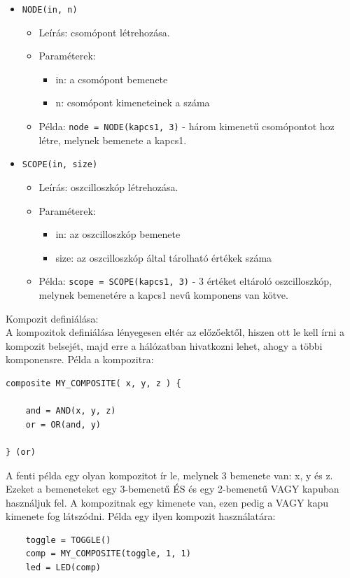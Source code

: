 \begin{itemize}
\item \texttt{NODE(in, n)}
	\begin{itemize}
	\item Leírás: csomópont létrehozása.
	\item Paraméterek: 
		\begin{itemize}
			\item in: a csomópont bemenete
			\item n: csomópont kimeneteinek a száma
		\end{itemize}
	\item Példa: \texttt{node = NODE(kapcs1, 3)} - három kimenetű csomópontot hoz létre, melynek bemenete a kapcs1.
	\end{itemize}
	
\item \texttt{SCOPE(in, size)}
\begin{itemize}
	\item Leírás: oszcilloszkóp létrehozása.
	\item Paraméterek: 
		\begin{itemize}
			\item in: az oszcilloszkóp bemenete
			\item size: az oszcilloszkóp által tárolható értékek száma
		\end{itemize}
	\item Példa: \texttt{scope = SCOPE(kapcs1, 3)} - 3 értéket eltároló oszcilloszkóp, melynek bemenetére a kapcs1 nevű komponens van kötve.
\end{itemize}

\end{itemize}

Kompozit definiálása:\\
A kompozitok definiálása lényegesen eltér az előzőektől, hiszen ott le kell írni a kompozit belsejét, majd erre a hálózatban hivatkozni lehet, ahogy a többi komponensre. Példa a kompozitra:
\begin{verbatim}
composite MY_COMPOSITE( x, y, z ) {

	and = AND(x, y, z)
	or = OR(and, y)

} (or)
\end{verbatim}

A fenti példa egy olyan kompozitot ír le, melynek 3 bemenete van: x, y és z. Ezeket a bemeneteket egy 3-bemenetű ÉS és egy 2-bemenetű VAGY kapuban használjuk fel. A kompozitnak egy kimenete van, ezen pedig a VAGY kapu kimenete fog látszódni. Példa egy ilyen kompozit használatára:
\begin{verbatim}
	toggle = TOGGLE()
	comp = MY_COMPOSITE(toggle, 1, 1)
	led = LED(comp)
\end{verbatim}
	
